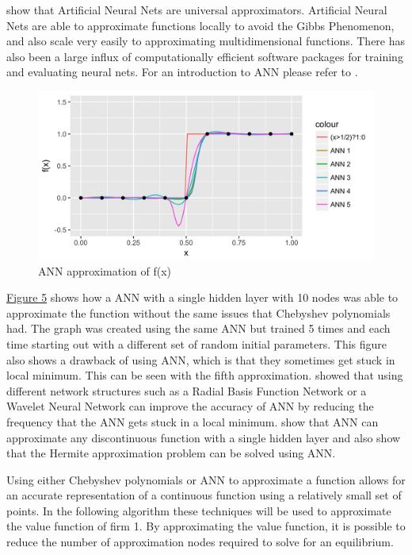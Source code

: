 \documentclass[12pt]{article}
\begin{document}
\cite{ann_uni} show that Artificial Neural Nets are universal approximators. Artificial Neural Nets are able to approximate functions locally to avoid the Gibbs Phenomenon, and also scale very easily to approximating multidimensional functions. There has also been a large influx of computationally efficient software packages for training and evaluating neural nets. For an introduction to ANN please refer to \citet{ann_tutorial}.

\begin{figure}[H]
  \label{ref_ANN_Ind_Func}
  \centering
  \includegraphics[scale=1]{plot_ANN_Ind_Func}
  \caption{ANN approximation of f(x)}
\end{figure}

\hyperref[ref_ANN_Ind_Func]{Figure 5} shows how a ANN with a single hidden layer with 10 nodes was able to approximate the function without the same issues that Chebyshev polynomials had. The graph was created using the same ANN but trained 5 times and each time starting out with a different set of random initial parameters. This figure also shows a drawback of using ANN, which is that they sometimes get stuck in local minimum. This can be seen with the fifth approximation. \citet{ann_radial} showed that using different network structures such as a Radial Basis Function Network or a Wavelet Neural Network can improve the accuracy of ANN by reducing the frequency that the ANN gets stuck in a local minimum. \citet{ann_disc} show that ANN can approximate any discontinuous function with a single hidden layer and \citet{ann_herm} also show that the Hermite approximation problem can be solved using ANN.

Using either Chebyshev polynomials or ANN to approximate a function allows for an accurate representation of a continuous function using a relatively small set of points. In the following algorithm these techniques will be used to approximate the value function of firm 1. By approximating the value function, it is possible to reduce the number of approximation nodes required to solve for an equilibrium.
\end{document}
